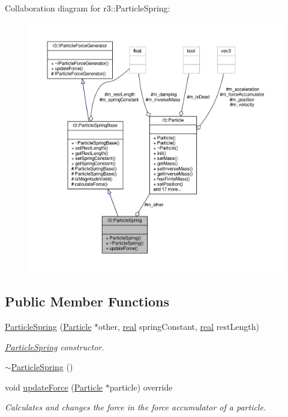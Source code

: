 Collaboration diagram for r3\+:\+:Particle\+Spring\+:\nopagebreak
\begin{figure}[H]
\begin{center}
\leavevmode
\includegraphics[width=350pt]{classr3_1_1_particle_spring__coll__graph}
\end{center}
\end{figure}
\subsection*{Public Member Functions}
\begin{DoxyCompactItemize}
\item 
\mbox{\hyperlink{classr3_1_1_particle_spring_af9b9193c28a36a6e070483136f63a9ab}{Particle\+Spring}} (\mbox{\hyperlink{classr3_1_1_particle}{Particle}} $\ast$other, \mbox{\hyperlink{namespacer3_ab2016b3e3f743fb735afce242f0dc1eb}{real}} spring\+Constant, \mbox{\hyperlink{namespacer3_ab2016b3e3f743fb735afce242f0dc1eb}{real}} rest\+Length)
\begin{DoxyCompactList}\small\item\em \mbox{\hyperlink{classr3_1_1_particle_spring}{Particle\+Spring}} constructor. \end{DoxyCompactList}\item 
\mbox{\hyperlink{classr3_1_1_particle_spring_a958707806b191f920e44eaff86aa124e}{$\sim$\+Particle\+Spring}} ()
\item 
void \mbox{\hyperlink{classr3_1_1_particle_spring_a16f6dd1c995223af3a15ff9a1e2eb375}{update\+Force}} (\mbox{\hyperlink{classr3_1_1_particle}{Particle}} $\ast$particle) override
\begin{DoxyCompactList}\small\item\em Calculates and changes the force in the force accumulator of a particle. \end{DoxyCompactList}\end{DoxyCompactItemize}
